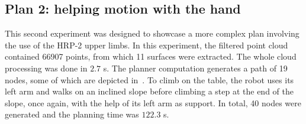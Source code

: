 \subsection{Plan 2: helping motion with the hand}
This second experiment was designed to showcase a more complex plan involving the use of the HRP-2 upper limbs. In this experiment, the filtered point cloud contained 66907 points, from which 11 surfaces were extracted. The whole cloud processing was done in $2.7$ s. The planner computation generates a path of 19 nodes, some of which are depicted in~. To climb on the table, the robot uses its left arm and walks on an inclined slope before climbing a step at the end of the slope, once again, with the help of its left arm as support. In total, 40 nodes were generated and the planning time was $122.3$ s.

